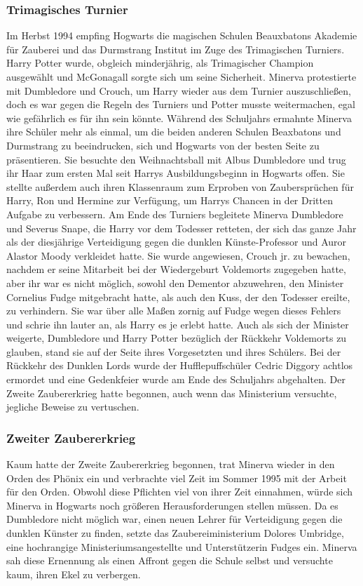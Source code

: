 \documentclass[a4paper, 10pt]{article}
\begin{document}
\subsubsection*{\large Trimagisches Turnier}
Im Herbst 1994 empfing Hogwarts die magischen Schulen Beauxbatons Akademie für Zauberei und das Durmstrang Institut im Zuge des Trimagischen Turniers. Harry Potter wurde, obgleich minderjährig, als Trimagischer Champion ausgewählt und McGonagall sorgte sich um seine Sicherheit. Minerva protestierte mit Dumbledore und Crouch, um Harry wieder aus dem Turnier auszuschließen, doch es war gegen die Regeln des Turniers und Potter musste weitermachen, egal wie gefährlich es für ihn sein könnte.
\vspace{10pt}
\newline
Während des Schuljahrs ermahnte Minerva ihre Schüler mehr als einmal, um die beiden anderen Schulen Beaxbatons und Durmstrang zu beeindrucken, sich und Hogwarts von der besten Seite zu präsentieren. Sie besuchte den Weihnachtsball mit Albus Dumbledore und trug ihr Haar zum ersten Mal seit Harrys Ausbildungsbeginn in Hogwarts offen. Sie stellte außerdem auch ihren Klassenraum zum Erproben von Zaubersprüchen für Harry, Ron und Hermine zur Verfügung, um Harrys Chancen in der Dritten Aufgabe zu verbessern. Am Ende des Turniers begleitete Minerva Dumbledore und Severus Snape, die Harry vor dem Todesser retteten, der sich das ganze Jahr als der diesjährige Verteidigung gegen die dunklen Künste-Professor und Auror Alastor Moody verkleidet hatte.
\vspace{10pt}
\newline
Sie wurde angewiesen, Crouch jr. zu bewachen, nachdem er seine Mitarbeit bei der Wiedergeburt Voldemorts zugegeben hatte, aber ihr war es nicht möglich, sowohl den Dementor abzuwehren, den Minister Cornelius Fudge mitgebracht hatte, als auch den Kuss, der den Todesser ereilte, zu verhindern. Sie war über alle Maßen zornig auf Fudge wegen dieses Fehlers und schrie ihn lauter an, als Harry es je erlebt hatte. Auch als sich der Minister weigerte, Dumbledore und Harry Potter bezüglich der Rückkehr Voldemorts zu glauben, stand sie auf der Seite ihres Vorgesetzten und ihres Schülers. Bei der Rückkehr des Dunklen Lords wurde der Hufflepuffschüler Cedric Diggory achtlos ermordet und eine Gedenkfeier wurde am Ende des Schuljahrs abgehalten. Der Zweite Zaubererkrieg hatte begonnen, auch wenn das Ministerium versuchte, jegliche Beweise zu vertuschen.
\subsubsection*{\large Zweiter Zaubererkrieg}
Kaum hatte der Zweite Zaubererkrieg begonnen, trat Minerva wieder in den Orden des Phönix ein und verbrachte viel Zeit im Sommer 1995 mit der Arbeit für den Orden. Obwohl diese Pflichten viel von ihrer Zeit einnahmen, würde sich Minerva in Hogwarts noch größeren Herausforderungen stellen müssen. Da es Dumbledore nicht möglich war, einen neuen Lehrer für Verteidigung gegen die dunklen Künster zu finden, setzte das Zaubereiministerium Dolores Umbridge, eine  hochrangige Ministeriumsangestellte und Unterstützerin Fudges ein. Minerva sah diese Ernennung als einen Affront gegen die Schule selbst und versuchte kaum, ihren Ekel zu verbergen.
\end{document}
